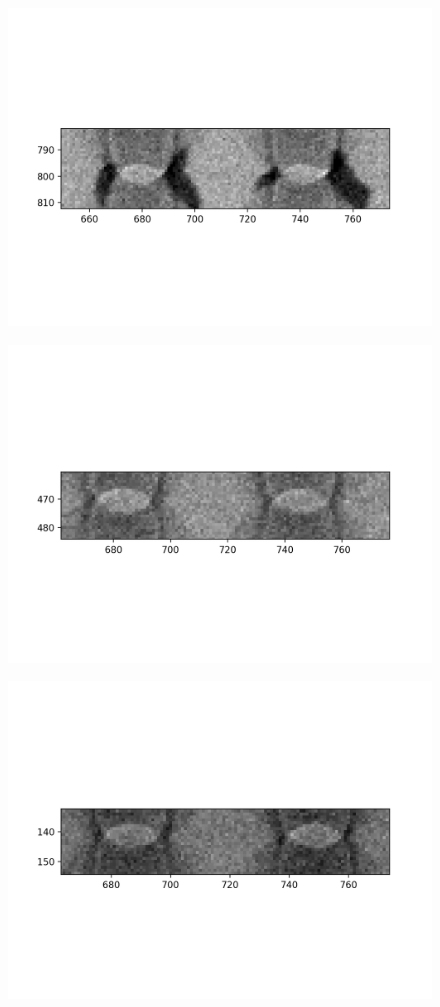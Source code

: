 \documentclass[10pt,a4paper]{article}
\begin{document}
\begin{figure}
	\includegraphics{data/image_stamps/d4}
\end{figure}
\begin{figure}
	\includegraphics{data/image_stamps/d5}
\end{figure}
\begin{figure}
	\includegraphics{data/image_stamps/d6}
\end{figure}
\end{document}
